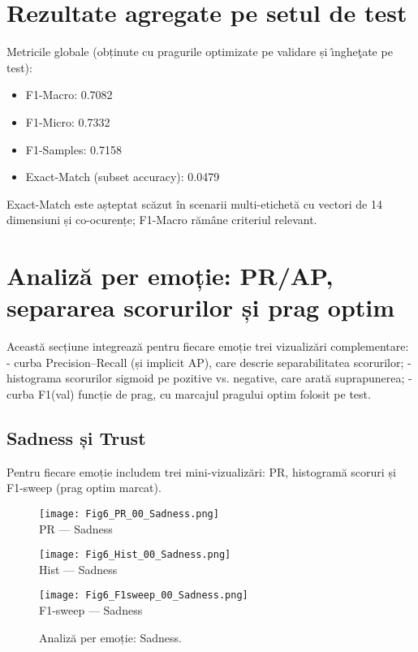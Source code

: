 \section{Rezultate agregate pe setul de test}
Metricile globale (obținute cu pragurile optimizate pe validare și \^{\i}nghe\c{t}ate pe test):
\begin{itemize}
  \item F1-Macro: 0.7082
  \item F1-Micro: 0.7332
  \item F1-Samples: 0.7158
  \item Exact-Match (subset accuracy): 0.0479
\end{itemize}
Exact-Match este așteptat scăzut în scenarii multi-etichetă cu vectori de 14 dimensiuni și co-ocurențe; F1-Macro rămâne criteriul relevant.

\section{Analiză per emoție: PR/AP, separarea scorurilor și prag optim}
Această secțiune integrează pentru fiecare emoție trei vizualizări complementare:
- curba Precision–Recall (și implicit AP), care descrie separabilitatea scorurilor;
- histograma scorurilor sigmoid pe pozitive vs. negative, care arată suprapunerea;
- curba F1(val) funcție de prag, cu marcajul pragului optim folosit pe test.

\subsection{Sadness și Trust}
\noindent Pentru fiecare emoție includem trei mini-vizualizări: PR, histogramă scoruri și F1-sweep (prag optim marcat).
\begin{figure}[H]
  \centering
  \begin{minipage}[t]{0.32\textwidth}\centering
    \texttt{[image: Fig6\_PR\_00\_Sadness.png]}\\[-1mm]
    {\scriptsize PR — Sadness}
  \end{minipage}\hfill
  \begin{minipage}[t]{0.32\textwidth}\centering
    \texttt{[image: Fig6\_Hist\_00\_Sadness.png]}\\[-1mm]
    {\scriptsize Hist — Sadness}
  \end{minipage}\hfill
  \begin{minipage}[t]{0.32\textwidth}\centering
    \texttt{[image: Fig6\_F1sweep\_00\_Sadness.png]}\\[-1mm]
    {\scriptsize F1-sweep — Sadness}
  \end{minipage}
  \caption{Analiză per emoție: Sadness.}
  \label{fig:c6-sadness}
\end{figure}

